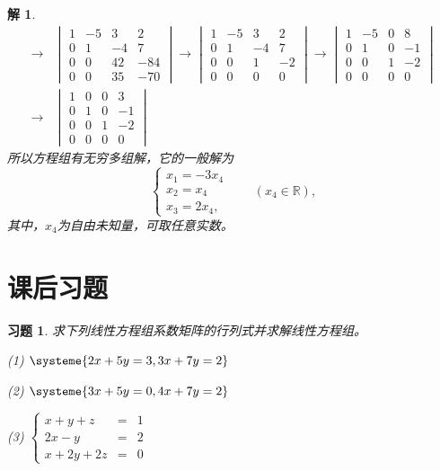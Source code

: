 \documentclass[a4paper]{book}
\newtheorem{ex}{习题}[chapter]
\newtheorem*{solution}{解}
\newcommand{\enum}{\begin{list}{}{\setlength{\leftmargin}{0pt} \setlength{\itemindent}{2.5em} \setlength{\listparindent}{2em}}}
\begin{document}
\begin{solution}
\begin{align*}
\longrightarrow & \begin{vmatrix} 1 & -5 & 3 & 2 \\ 0 & 1 & -4 & 7 \\ 0 & 0 & 42 & -84 \\ 0 & 0 & 35 & -70 \end{vmatrix} \longrightarrow \begin{vmatrix} 1 & -5 & 3 & 2 \\ 0 & 1 & -4 & 7 \\ 0 & 0 & 1 & -2 \\ 0 & 0 & 0 & 0 \end{vmatrix}\longrightarrow \begin{vmatrix} 1 & -5 & 0 & 8 \\ 0 & 1 & 0 & -1 \\ 0 & 0 & 1 & -2 \\ 0 & 0 & 0 & 0 \end{vmatrix} \\
\longrightarrow & \begin{vmatrix} 1 & 0 & 0 & 3 \\ 0 & 1 & 0 & -1 \\ 0 & 0 & 1 & -2 \\ 0 & 0 & 0 & 0 \end{vmatrix}
\end{align*}
所以方程组有无穷多组解，它的一般解为
$$\begin{cases}
x_1 = -3x_4 \\ x_2 = x_4 \\ x_3 = 2x_4,
\end{cases} \qquad (x_4\in\mathbb{R}),$$
其中，$x_4$为自由未知量，可取任意实数。
\end{solution}


\section{课后习题}

\begin{ex} \label{ex:1.1}
求下列线性方程组系数矩阵的行列式并求解线性方程组。
\enum
\item[(1)] $\systeme{2x + 5y = 3 , 3x + 7y = 2}$
\item[(2)] $\systeme{3x + 5y = 0 , 4x + 7y = 2}$
\item[(3)] $\left\{ \begin{array}{rcl} x + y + z & = & 1 \\ 2x - y & = & 2 \\ x + 2y + 2z & = & 0\end{array}\right.$
\end{list}
\end{ex}
\end{document}
